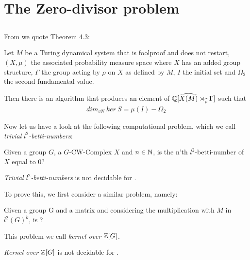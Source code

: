 \section{The Zero-divisor problem}



\subsection{}

From \cite{gra14} we quote Theorem 4.3:

\begin{Theorem}
	\label{the_zero_divisor_problem:grabowskis_theorem}
	Let $M$ be a Turing dynamical system that is foolproof and does not restart,
	$(X, \mu)$ the associated probability measure space where $X$ has an added group structure,
	$\Gamma$ the group acting by $\rho$ on $X$ as defined by $M$,
	$I$ the initial set and
	$\Omega_2$ the second fundamental value.

	Then there is an algorithm that produces an element of $\mathbb{Q}[\widehat{X(M)} \rtimes_{\widehat{\rho}} \Gamma]$ such that
	\begin{align*}
		dim_{vN} ~ ker ~ S = \mu(I) - \Omega_2
	\end{align*}
\end{Theorem}

Now let us have a look at the following computational problem, which we call \emph{trivial $l^2$-betti-numbers}:

Given a group $G$, a $G$-CW-Complex $X$ and $n \in \mathbb{N}$, is the n'th $l^2$-betti-number of $X$ equal to 0?

\begin{Theorem}
	\label{zero-divisor-problem:trivial_betti_numbers}
	\emph{Trivial $l^2$-betti-numbers} is not decidable for .
\end{Theorem}

To prove this, we first consider a similar problem, namely:

Given a group G and a matrix 
and considering the multiplication with $M$ in $l^2(G)^k$, is ?

This problem we call \emph{kernel-over-$\mathbb{Z}[G]$}.

\begin{Theorem}
	\emph{Kernel-over-$\mathbb{Z}[G]$} is not decidable for .
\end{Theorem}


